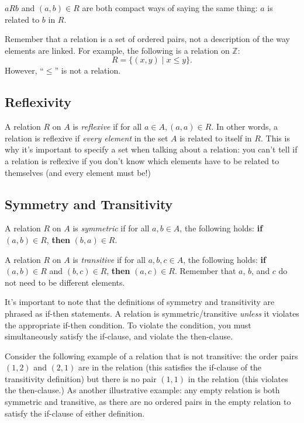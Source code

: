 \documentclass[12pt,letterpaper]{article}
\newcommand\Z{\mathbb Z}
\begin{document}
    $aRb$ and $(a,b) \in R$ are both compact ways of saying the same thing: $a$ is related to $b$ in $R$.
    
    Remember that a relation is a set of ordered pairs, not a description of the way elements are linked. For example, the following is a relation on $\Z$:
    \[
    R = \{(x,y) \mid x \leq y\}.
    \]
    However, ``$\leq$'' is not a relation.
    
    \subsection{Reflexivity}
    
    A relation $R$ on $A$ is \textit{reflexive} if for all $a \in A, (a,a) \in R$. In other words, a relation is reflexive if \emph{every element} in the set $A$ is related to itself in $R$. This is why it's important to specify a set when talking about a relation: you can't tell if a relation is reflexive if you don't know which elements have to be related to themselves (and every element must be!)

    \subsection{Symmetry and Transitivity}
    A relation $R$ on $A$ is \textit{symmetric} if for all $a,b \in A$, the following holds: \textbf{if} $(a,b) \in R$, \textbf{then} $(b,a) \in R$. 
    
    A relation $R$ on $A$ is \textit{transitive} if for all $a,b,c \in A$, the following holds: \textbf{if} $(a,b) \in R$ and $(b,c) \in R$, \textbf{then} $(a,c) \in R$. Remember that $a$, $b$, and $c$ do not need to be different elements.
    
    It's important to note that the definitions of symmetry and transitivity are phrased as if-then statements. A relation is symmetric/transitive \emph{unless} it violates the appropriate if-then condition. To violate the condition, you must simultaneously satisfy the if-clause, and violate the then-clause. 
    
    Consider the following example of a relation that is not transitive: the order pairs $(1,2)$ and $(2,1)$ are in the relation (this satisfies the if-clause of the transitivity definition) but there is no pair $(1,1)$ in the relation (this violates the then-clause.) As another illustrative example: any empty relation is both symmetric and transitive, as there are no ordered pairs in the empty relation to satisfy the if-clause of either definition.
    
\end{document}
